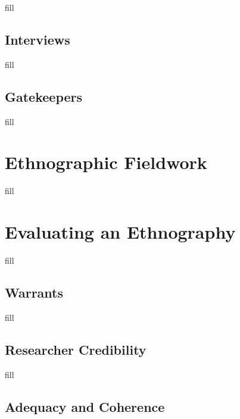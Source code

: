 \documentclass[
  b5paper]{book}
\begin{document}
fill

\hypertarget{interviews-2}{%
\subsection*{Interviews}\label{interviews-2}}

fill

\hypertarget{gatekeepers}{%
\subsection*{Gatekeepers}\label{gatekeepers}}

fill

\hypertarget{ethnographic-fieldwork}{%
\section{Ethnographic Fieldwork}\label{ethnographic-fieldwork}}

fill

\hypertarget{evaluating-an-ethnography}{%
\section{Evaluating an Ethnography}\label{evaluating-an-ethnography}}

fill

\hypertarget{warrants}{%
\subsection*{Warrants}\label{warrants}}

fill

\hypertarget{researcher-credibility}{%
\subsection*{Researcher Credibility}\label{researcher-credibility}}

fill

\hypertarget{adequacy-and-coherence}{%
\subsection*{Adequacy and Coherence}\label{adequacy-and-coherence}}
\end{document}

